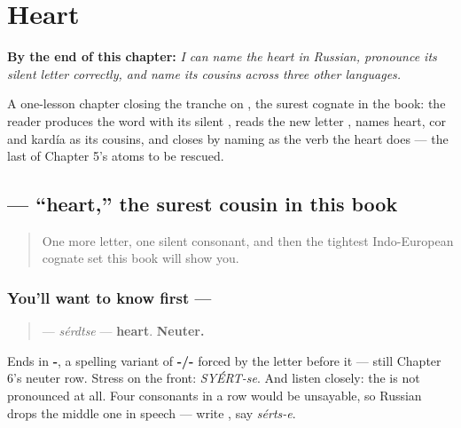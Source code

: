 
\chapter{Heart}
\label{ch:russian-heart}

\begin{chapteropening}
\textbf{By the end of this chapter:} \emph{I can name the heart in Russian, pronounce its silent letter correctly, and name its cousins across three other languages.}

A one-lesson chapter closing the tranche on , the surest cognate in the book: the reader produces the word with its silent , reads the new letter , names heart, cor and kardía as its cousins, and closes by naming  as the verb the heart does — the last of Chapter 5's atoms to be rescued.
\end{chapteropening}

\section[\texorpdfstring{\ru{сердце} (sérdtse)}{сердце (sérdtse)}]{ — \textquotedblleft{}heart,\textquotedblright{} the surest cousin in this book}

\label{lesson:RU-C10-serdtse}



\begin{quote}
One more letter, one silent consonant, and then the tightest Indo-European cognate set this book will show you.
\end{quote}

\subsection*{You'll want to know first — }
\begin{quote}
\textbf{} — \emph{sérdtse} — \textbf{heart}. \textbf{Neuter.}
\end{quote}

Ends in \textbf{-}, a spelling variant of \textbf{-/-} forced by the letter before it — still Chapter 6's neuter row. Stress on the front: \emph{SYÉRT-se}. And listen closely: the \textbf{} is not pronounced at all. Four consonants in a row would be unsayable, so Russian drops the middle one in speech — write \emph{}, say \emph{sérts-e}.

